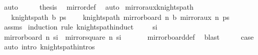 \begin{isabellebody}
\ auto\isanewline
\ \ \isamarkupfalse%
\ \isamarkupfalse%
\ {\isacharquery}{\kern0pt}thesis\ \isamarkupfalse%
\ mirror{}{\isacharunderscore}{\kern0pt}def\ \isamarkupfalse%
\ auto\isanewline
{}\isamarkupfalse%
%
\endisatagproof
{\isafoldproof}%
%
\isadelimproof
\isanewline
%
\endisadelimproof
\isanewline
{}\isamarkupfalse%
\ mirror{}{\isacharunderscore}{\kern0pt}aux{\isacharunderscore}{\kern0pt}knights{\isacharunderscore}{\kern0pt}path{\isacharcolon}{\kern0pt}\isanewline
\ \ \ {\isachardoublequoteopen}knights{\isacharunderscore}{\kern0pt}path\ b\ ps{\isachardoublequoteclose}\ \isanewline
\ \ \ {\isachardoublequoteopen}knights{\isacharunderscore}{\kern0pt}path\ {\isacharparenleft}{\kern0pt}mirror{}{\isacharunderscore}{\kern0pt}board\ n\ b{\isacharparenright}{\kern0pt}\ {\isacharparenleft}{\kern0pt}mirror{}{\isacharunderscore}{\kern0pt}aux\ n\ ps{\isacharparenright}{\kern0pt}{\isachardoublequoteclose}\isanewline
%
\isadelimproof
\ \ %
\endisadelimproof
%
\isatagproof
{}\isamarkupfalse%
\ assms\isanewline
{}\isamarkupfalse%
\ {\isacharparenleft}{\kern0pt}induction\ rule{\isacharcolon}{\kern0pt}\ knights{\isacharunderscore}{\kern0pt}path{\isachardot}{\kern0pt}induct{\isacharparenright}{\kern0pt}\isanewline
\ \ \isamarkupfalse%
\ {\isacharparenleft}{\kern0pt}{}\ s\isactrlsub i{\isacharparenright}{\kern0pt}\isanewline
\ \ \isamarkupfalse%
\ \isamarkupfalse%
\ {\isachardoublequoteopen}mirror{}{\isacharunderscore}{\kern0pt}board\ n\ {\isacharbraceleft}{\kern0pt}s\isactrlsub i{\isacharbraceright}{\kern0pt}\ {\isacharequal}{\kern0pt}\ {\isacharbraceleft}{\kern0pt}mirror{}{\isacharunderscore}{\kern0pt}square\ n\ s\isactrlsub i{\isacharbraceright}{\kern0pt}{\isachardoublequoteclose}\ \isanewline
\ \ \ \ \isamarkupfalse%
\ mirror{}{\isacharunderscore}{\kern0pt}board{\isacharunderscore}{\kern0pt}def\ \isamarkupfalse%
\ blast\isanewline
\ \ \isamarkupfalse%
\ \isamarkupfalse%
\ {\isacharquery}{\kern0pt}case\ \isamarkupfalse%
\ {\isacharparenleft}{\kern0pt}auto\ intro{\isacharcolon}{\kern0pt}\ knights{\isacharunderscore}{\kern0pt}path{\isachardot}{\kern0pt}intros{\isacharparenright}{\kern0pt}\isanewline
{}\isamarkupfalse%
\isanewline
\ \ \isamarkupfalse%

\end{isabellebody}
